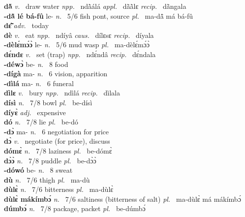\noindent
{\bfseries dã̀}  {\itshape v.~} draw water   {\itshape npp.~} ndã̀álá {\itshape appl.~} dã̀ã̀lɛ {\itshape recip.~} dã̀ngala  \\ 
{\bfseries -dã̂ lé bá-fû} le- {\itshape n.~} 5/6 fish pont, source {\itshape pl.~} ma-dã̂ má bá-fû    \\ 
{\bfseries dɛ̃̂}  {\itshape adv.~} today    \\ 
{\bfseries dè}  {\itshape v.~} eat   {\itshape npp.~} ndíyâ {\itshape caus.~} dílɛsɛ {\itshape recip.~} díyala  \\ 
{\bfseries -dèlɛ́mɔ́ɔ̀} le- {\itshape n.~} 5/6 mud wasp {\itshape pl.~} ma-dèlɛ́mɔ́ɔ̀    \\ 
{\bfseries dɛ́ndɛ}  {\itshape v.~} set (trap)   {\itshape npp.~} ndɛ́ndâ {\itshape recip.~} dɛ́ndala  \\ 
{\bfseries -déwɔ̀} be- {\itshape n.~} 8 food    \\ 
{\bfseries -dígà} ma- {\itshape n.~} 6 vision, apparition    \\ 
{\bfseries -dìlá} ma- {\itshape n.~} 6 funeral    \\ 
{\bfseries dìlɛ}  {\itshape v.~} bury   {\itshape npp.~} ndìlá {\itshape recip.~} dìlala  \\ 
{\bfseries dísì}  {\itshape n.~} 7/8 bowl {\itshape pl.~} be-dísì    \\ 
{\bfseries díyɛ̀}  {\itshape adj.~} expensive    \\ 
{\bfseries dó}  {\itshape n.~} 7/8 lie {\itshape pl.~} be-dó    \\ 
{\bfseries -dɔ̀} ma- {\itshape n.~} 6 negotiation for price    \\ 
{\bfseries dɔ̀}  {\itshape v.~} negotiate (for price), discuss    \\ 
{\bfseries dómɛ̀}  {\itshape n.~} 7/8 laziness {\itshape pl.~} be-dómɛ̀   \\ 
{\bfseries dɔ̀ɔ̀}  {\itshape n.~} 7/8 puddle {\itshape pl.~} be-dɔ̀ɔ̀    \\ 
{\bfseries -dówó} be- {\itshape n.~} 8 sweat    \\ 
{\bfseries dù}  {\itshape n.~} 7/6 thigh {\itshape pl.~} ma-dù    \\ 
{\bfseries dùlɛ̀}  {\itshape n.~} 7/6 bitterness {\itshape pl.~} ma-dùlɛ̀    \\ 
{\bfseries dùlɛ̀ mákímbɔ́}  {\itshape n.~} 7/6 saltiness (bitterness of salt) {\itshape pl.~} ma-dùlɛ̀ má mákímbɔ́   \\ 
{\bfseries dúmbɔ́}  {\itshape n.~} 7/8 package, packet {\itshape pl.~} be-dúmbɔ́    \\ 
